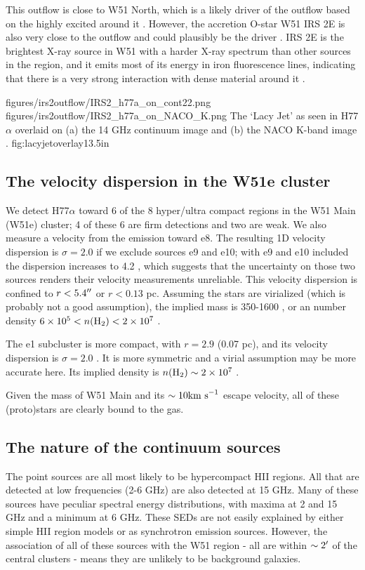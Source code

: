 This outflow is close to W51 North, which is a likely driver of the outflow based
on the highly excited \ammonia around it \citep{Henkel2013a,Goddi2015a}.  However,
the accretion O-star W51 IRS 2E is also very close to the outflow and could plausibly
be the driver \citep{Barbosa2008a}.  IRS 2E is the brightest X-ray source in
W51 with a harder X-ray spectrum than other sources in the region, and it emits
most of its energy in iron fluorescence lines, indicating that there is a very
strong interaction with dense material around it \citep{Townsley2014a}.


\FigureTwo
{figures/irs2outflow/IRS2_h77a_on_cont22.png}
{figures/irs2outflow/IRS2_h77a_on_NACO_K.png}
{The `Lacy Jet' as seen in H77$\alpha$ overlaid on (a) the 14 GHz continuum
image and (b) the NACO K-band image \citep{Barbosa2008a}.}
{fig:lacyjetoverlay}{1}{3.5in}

\subsection{The velocity dispersion in the W51e cluster}
We detect H77$\alpha$ toward 6 of the 8 hyper/ultra compact \hii regions in the
W51 Main (W51e) cluster; 4 of these 6 are firm detections and two are weak.  We
also measure a velocity from the \formaldehyde emission toward e8.  The
resulting 1D velocity dispersion is $\sigma=2.0$ \kms if we exclude sources e9
and e10; with e9 and e10 included the dispersion increases to 4.2 \kms, which
suggests that the uncertainty on those two sources renders their velocity
measurements unreliable.  This velocity dispersion is confined to
$r<5.4\mbox{$^{\prime\prime}$}$ or $r<0.13$ pc.  Assuming the stars are virialized (which is
probably not a good assumption), the implied mass is 350-1600 \msun, or an \hh
number density $6\times10^{5} < n(\textrm{H}_{2}) < 2\times10^{7}$ \percc.

The e1 subcluster is more compact, with $r=2.9$ \arcsec (0.07 pc), and its
velocity dispersion is $\sigma=2.0$ \kms.  It is more symmetric and a virial
assumption may be more accurate here.  Its implied density
is $n(\textrm{H}_{2})\sim2\times10^{7}$ \percc.

Given the mass of W51 Main and its $\sim10\textrm{km~s}^{-1}$ escape velocity, all of these
(proto)stars are clearly bound to the gas. 

\subsection{The nature of the continuum sources}
The point sources are all most likely to be hypercompact HII regions.  All that
are detected at low frequencies (2-6 GHz) are also detected at 15 GHz.  Many of
these sources have peculiar spectral energy distributions, with maxima at 2 and
15 GHz and a minimum at 6 GHz.  These SEDs are not easily explained by either
simple HII region models or as synchrotron emission sources.  However, the
association of all of these sources with the W51 region - all are within
$\sim2\mbox{$^\prime$}$ of the central clusters - means they are unlikely to be
background galaxies.  

